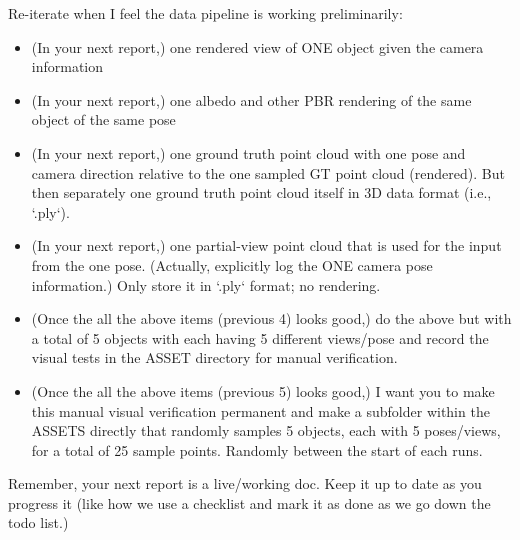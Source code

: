 Re-iterate when I feel the data pipeline is working preliminarily:
\begin{itemize}
    \item (In your next report,) one rendered view of ONE object given the camera information
    \item (In your next report,) one albedo and other PBR rendering of the same object of the same pose
    \item (In your next report,) one ground truth point cloud with one pose and camera direction relative to the one sampled GT point cloud (rendered). But then separately one ground truth point cloud itself in 3D data format (i.e., `.ply`).
    \item (In your next report,) one partial-view point cloud that is used for the input from the one pose. (Actually, explicitly log the ONE camera pose information.) Only store it in `.ply` format; no rendering.
    \item (Once the all the above items (previous 4) looks good,) do the above but with a total of 5 objects with each having 5 different views/pose and record the visual tests in the ASSET directory for manual verification.
    \item (Once the all the above items (previous 5) looks good,) I want you to make this manual visual verification permanent and make a subfolder within the ASSETS directly that randomly samples 5 objects, each with 5 poses/views, for a total of 25 sample points. Randomly between the start of each runs.
\end{itemize}

Remember, your next report is a live/working doc. Keep it up to date as you progress it (like how we use a checklist and mark it as done as we go down the todo list.)